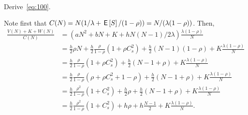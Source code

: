 \documentclass[queueing-book.tex]{subfiles}
\begin{document}



\begin{exercise}\label{ex:n-mg3}
Derive~\cref{eq:100}.
\begin{solution}
  Note first that $C(N) = N(1/\lambda + \,\mathsf{E}\left[S\right] / (1-\rho)) = N/(\lambda(1-\rho))$. Then,
  \begin{align*}
    \frac{V(N) + K + W(N)}{C(N)}
    &= \left(aN^2 + bN + K + h N(N-1)/2 \lambda\right) \frac{\lambda(1-\rho)}N \\
    &= \frac h 2 \rho N  + \frac h 2 \frac \rho{1-\rho} (1+\rho C_s^2) + \frac h 2 (N-1)(1-\rho) + K \frac{\lambda(1-\rho)}N \\
    &= \frac h 2 \frac \rho{1-\rho} (1+\rho C_s^2) + \frac h 2 (N-1 + \rho) + K \frac{\lambda(1-\rho)}N \\
    &= \frac h 2 \frac \rho{1-\rho} (\rho + \rho C_s^2 + 1 - \rho) + \frac h 2 (N-1 + \rho) + K \frac{\lambda(1-\rho)}N \\
    &= \frac h 2 \frac{\rho^2}{1-\rho} (1+ C_s^2) +\frac h 2 \rho + \frac h 2 (N-1 + \rho) + K \frac{\lambda(1-\rho)}N \\
    &= \frac h 2 \frac{\rho^2}{1-\rho} (1+ C_s^2) + h \rho + h \frac{N-1}2 + K \frac{\lambda(1-\rho)}N.
  \end{align*}
\end{solution}
\end{exercise}
\end{document}
